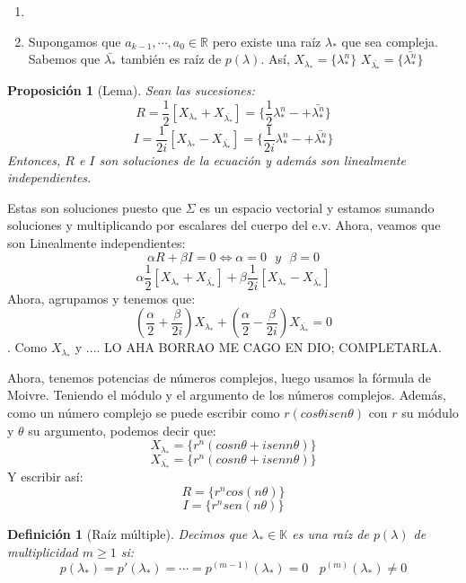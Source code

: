 \documentclass[11pt, a4paper]{article}
\makeatletter
\newif\IfInSansMode
\let\oldsf\sffamily
\renewcommand*{\sffamily}{\oldsf\mathversion{sans}\InSansModetrue}
\let\oldnorm\normalfont
\renewcommand*{\normalfont}{\oldnorm\InSansModefalse\mathversion{normal}}
\renewenvironment{proof}[1][\proofname] {\vspace{-15pt}\par\pushQED{\qed}\normalfont\topsep6\p@\@plus6\p@\relax\trivlist\item[\hskip\labelsep\it#1\@addpunct{.}]\ignorespaces}{\popQED\endtrivlist\@endpefalse}
\numberwithin{equation}{section}
\newcommand{\R}{\mathbb{R}}
\renewenvironment{proof}[1][\proofname] {\par\pushQED{\qed}\normalfont\topsep6\p@\@plus6\p@\relax\trivlist\item[\hskip\labelsep\itshape\sffamily#1\@addpunct{.}]\ignorespaces}{\popQED\endtrivlist\@endpefalse}
\theoremstyle{theorem-style}
\newtheorem{nprop}{Proposición}[section]
\theoremstyle{definition-style}
\newtheorem{ndef}{Definición}[section]
\theoremstyle{remark-style}
\theoremstyle{example-style}
\makeatother
\begin{document}
        \begin{enumerate}
	\item
	\item Supongamos que $a_{k-1},\cdots,a_0\in \R$ pero existe una raíz
          $\lambda_*$ que sea compleja. Sabemos que $\bar{\lambda_*}$ también es
          raíz de $p(\lambda)$. Así, $X_{\lambda_*}= \{\lambda_*^n\}$
          $X_{\bar{\lambda_*}}= \{\bar{\lambda_*^n}\}$
        \end{enumerate}

\begin{nprop}[Lema]
  Sean las sucesiones:
$$ R= \dfrac{1}{2} [X_{\lambda_*}+ X_{\bar{\lambda_*}}] = \{\dfrac{1}{2}\lambda_*^n -+\bar{\lambda_*^n}\}$$
$$ I = \dfrac{1}{2i}[X_{\lambda_*} -X_{\bar{\lambda_*}}] = \{\dfrac{1}{2i}\lambda_*^n -+\bar{\lambda_*^n}\}$$
Entonces, $R$ e $I$ son soluciones de la ecuación y además son linealmente
independientes.
\end{nprop}
\begin{proof}
  Estas son soluciones puesto que $\Sigma$ es un espacio vectorial y estamos
  sumando soluciones y multiplicando por escalares del cuerpo del e.v.  Ahora,
  veamos que son Linealmente independientes:
	$$ \alpha R + \beta I = 0 \iff \alpha = 0 \ \ \ y \ \ \ \beta  = 0$$
	$$ \alpha \dfrac{1}{2} [X_{\lambda_*}+ X_{\bar{\lambda_*}}]  + \beta \dfrac{1}{2i}[X_{\lambda_*} -X_{\bar{\lambda_*}}]$$
	Ahora, agrupamos y tenemos que:
	$$ (\dfrac{\alpha}{2} + \dfrac{\beta}{2i}) X_{\lambda_*} + (\dfrac{\alpha}{2} - \dfrac{\beta}{2i}) X_{\bar{\lambda_*}} = 0$$.
	Como $X_{\lambda_*}$ y .... LO AHA BORRAO ME CAGO EN DIO; COMPLETARLA.
	
	Ahora, tenemos potencias de números complejos, luego usamos la fórmula
        de Moivre. Teniendo el módulo y el argumento de los números
        complejos. Además, como un número complejo se puede escribir como
        $r(cos \theta i sen\theta)$ con $r$ su módulo y $\theta$ su argumento,
        podemos decir que:
	$$X_{\lambda_*}= \{r^n(cos n\theta + i sen n \theta)\} $$
	$$ X_{\bar{\lambda_*}}= \{r^n(cos n\theta + i sen n \theta)\} $$
	Y escribir así:
	$$ R = \{r^n cos (n\theta)\}$$
	$$ I = \{r^n sen (n\theta)\}$$
      \end{proof}


\begin{ndef}[Raíz múltiple]
  Decimos que $\lambda_* \in \mathbb K$ es una raíz de $p(\lambda)$ de
  multiplicidad $m\geq 1$ si:
	$$ p(\lambda_*) = p'(\lambda_*) =  \cdots = p^{(m-1)}(\lambda_*) = 0 \ \ \ \ p^{(m)}(\lambda_*) \ne 0 $$
      \end{ndef}
\end{document}
